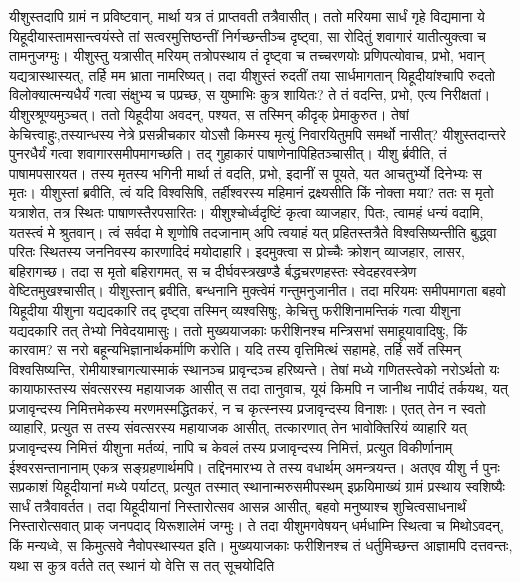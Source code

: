 \vakya यीशुस्तदापि ग्रामं न प्रविष्टवान्, मार्था यत्र तं प्राप्तवती तत्रैवासीत्।
\vakya ततो मरियमा सार्धं गृहे विद्यमाना ये यिहूदीयास्तामसान्त्वयंस्ते तां सत्वरमुत्तिष्ठन्तीं निर्गच्छन्तीञ्च दृष्ट्वा, सा रोदितुं शवागारं यातीत्युक्त्वा च तामनुजग्मुः।
\vakya यीशुस्तु यत्रासीत् मरियम् तत्रोपस्थाय तं दृष्ट्वा च तच्चरणयोः प्रणिपत्योवाच, प्रभो, भवान् यद्यत्रास्थास्यत्, तर्हि मम भ्राता नामरिष्यत्।
\vakya तदा यीशुस्तं रुदतीं तया सार्धमागतान् यिहूदीयांश्चापि रुदतो विलोक्यात्मन्यधैर्यं गत्वा संक्षुभ्य च पप्रच्छ, स युष्माभिः कुत्र शायितः?
\vakya ते तं वदन्ति, प्रभो, एत्य निरीक्षतां।
\vakya यीशुरश्रूण्यमुञ्चत्।
\vakya ततो यिहूदीया अवदन्, पश्यत, स तस्मिन् कीदृक् प्रेमाकुरुत।
\vakya तेषां केचित्त्वाहुः,तस्यान्धस्य नेत्रे प्रसन्नीचकार योऽसौ किमस्य मृत्युं निवारयितुमपि समर्थो नासीत्?
\vakya यीशुस्तदान्तरे पुनरधैर्यं गत्वा शवागारसमीपमागच्छति। तद् गुहाकारं पाषाणेनापिहितञ्चासीत्।
\vakya यीशु र्ब्रवीति, तं पाषामपसारयत। तस्य मृतस्य भगिनी मार्था तं वदति, प्रभो, इदानीं स पूयते, यत आचतुर्भ्यो दिनेभ्यः स मृतः।
\vakya यीशुस्तां ब्रवीति, त्वं यदि विश्वसिषि, तर्हीश्वरस्य महिमानं द्रक्ष्यसीति किं नोक्ता मया?
\vakya ततः स मृतो यत्राशेत, तत्र स्थितः पाषाणस्तैरपसारितः। यीशुश्चोर्ध्वदृष्टिं कृत्वा व्याजहार, पितः, त्वामहं धन्यं वदामि, यतस्त्वं मे श्रुतवान्।
\vakya त्वं सर्वदा मे शृणोषि तदजानाम् अपि त्वयाहं यत् प्रहितस्तत्रैते विश्वसिष्यन्तीति बुद्ध्वा परितः स्थितस्य जननिवस्य कारणादिदं मयोदाहारि।
\vakya इदमुक्त्वा स प्रोच्चैः क्रोशन् व्याजहार, लासर, बहिरागच्छ।
\vakya तदा स मृतो बहिरागमत्, स च दीर्घवस्त्रखण्डै र्बद्धचरणहस्तः स्वेदहरवस्त्रेण वेष्टितमुखश्चासीत्। यीशुस्तान् ब्रवीति, बन्धनानि मुक्त्वेमं गन्तुमनुजानीत।
\vakya तदा मरियमः समीपमागता बहवो यिहूदीया यीशुना यद्यदकारि तद् दृष्ट्वा तस्मिन् व्यश्वसिषुः,
\vakya केचित्तु फरीशिनामन्तिकं गत्वा यीशुना यद्यदकारि तत् तेभ्यो निवेदयामासुः।
\vakya ततो मुख्ययाजकाः फरीशिनश्च मन्त्रिसभां समाहूयावादिषुः, किं कारवाम? स नरो बहून्यभिज्ञानार्थकर्माणि करोति।
\vakya यदि तस्य वृत्तिमित्थं सहामहे, तर्हि सर्वे तस्मिन् विश्वसिष्यन्ति, रोमीयाश्चागत्यास्माकं स्थानञ्च प्रावृन्दञ्च हरिष्यन्ते।
\vakya तेषां मध्ये गणितस्त्वेको नरोऽर्थतो यः कायाफास्तस्य संवत्सरस्य महायाजक आसीत् स तदा तानुवाच, यूयं किमपि न जानीथ नापीदं तर्कयथ,
\vakya यत् प्रजावृन्दस्य निमित्तमेकस्य मरणमस्मद्धितकरं, न च कृत्स्नस्य प्रजावृन्दस्य विनाशः।
\vakya एतत् तेन न स्वतो व्याहारि, प्रत्युत स तस्य संवत्सरस्य महायाजक आसीत्, तत्कारणात् तेन भावोक्तिरियं व्याहारि यत् प्रजावृन्दस्य निमित्तं यीशुना मर्तव्यं,
\vakya नापि च केवलं तस्य प्रजावृन्दस्य निमित्तं, प्रत्युत विकीर्णानाम् ईश्वरसन्तानानाम् एकत्र सङ्ग्रहणार्थमपि।
\vakya तद्दिनमारभ्य ते तस्य वधार्थम् अमन्त्रयन्त।
\vakya अतएव यीशु र्न पुनः सप्रकाशं यिहूदीयानां मध्ये पर्याटत्, प्रत्युत तस्मात् स्थानान्मरुसमीपस्थम् इफ्रयिमाख्यं ग्रामं प्रस्थाय स्वशिष्यैः सार्धं तत्रैवावर्तत।
\vakya तदा यिहूदीयानां निस्तारोत्सव आसन्न आसीत्, बहवो मनुष्याश्च शुचित्वसाधनार्थं निस्तारोत्सवात् प्राक् जनपदाद् यिरूशालेमं जग्मुः।
\vakya ते तदा यीशुमगवेषयन् धर्मधाम्नि स्थित्वा च मिथोऽवदन्, किं मन्यध्वे, स किमुत्सवे नैवोपस्थास्यत इति।
\vakya मुख्ययाजकाः फरीशिनश्च तं धर्तुमिच्छन्त आज्ञामपि दत्तवन्तः, यथा स कुत्र वर्तते तत् स्थानं यो वेत्ति स तत् सूचयोदिति\eoc